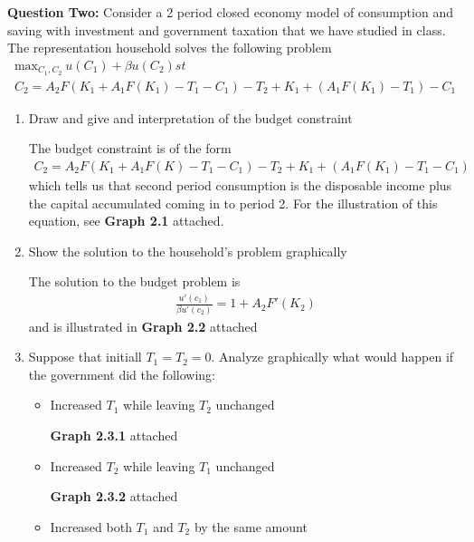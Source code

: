 \documentclass[11pt]{SelfArxOneColBMN}
\begin{document}
\bigskip
\textbf{Question Two:}
Consider a 2 period closed economy model of consumption and saving with investment and government taxation that we have studied in class. The representation household solves the following problem
\begin{eqnarray*}
  \text{max}_{C_1,C_2}\: u(C_1) + \beta u(C_2) st\\
  C_2 = A_2F(K_1 + A_1F(K_1) - T_1 - C_1) - T_2 + K_1 + (A_1F(K_1) - T_1) - C_1
\end{eqnarray*}
\begin{enumerate}
  \item Draw and give and interpretation of the budget constraint
  \begin{solution} 
    The budget constraint is of the form
    \begin{eqnarray*}
      C_2 = A_2F(K_1 + A_1F(K) - T_1 - C_1) - T_2 + K_1 + (A_1F(K_1) - T_1 - C_1)
    \end{eqnarray*}
    which tells us that second period consumption is the disposable income plus the capital accumulated coming in to period 2. For the illustration of this equation, see \textbf{Graph 2.1} attached.
  \end{solution}
  \item Show the solution to the household's problem graphically
  \begin{solution}
    The solution to the budget problem is 
    \begin{eqnarray*}
      \frac{u'(c_1)}{\beta u'(c_2)} = 1 + A_2 F'(K_2)
    \end{eqnarray*}
    and is illustrated in \textbf{Graph 2.2} attached
  \end{solution}
  \item Suppose that initiall $T_1 = T_2 = 0$. Analyze graphically what would happen if the government did the following:
  \begin{itemize}
    \item Increased $T_1$ while leaving $T_2$ unchanged
    \begin{solution}
      \textbf{Graph 2.3.1} attached
    \end{solution}
    \item Increased $T_2$ while leaving $T_1$ unchanged
    \begin{solution}
      \textbf{Graph 2.3.2} attached
    \end{solution}
    \item Increased both $T_1$ and $T_2$ by the same amount
    \begin{solution}

\end{solution}
\end{itemize}
\end{enumerate}
\end{document}
